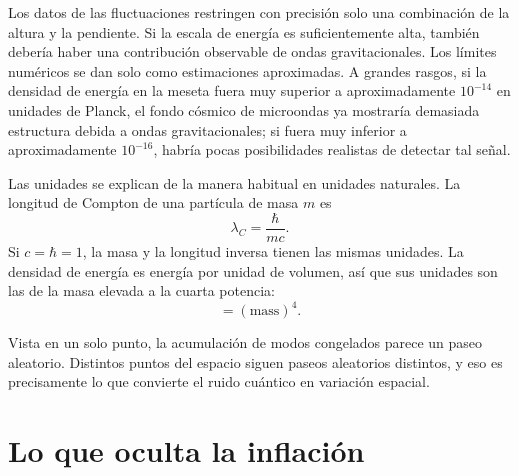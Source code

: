 Los datos de las fluctuaciones restringen con precisión solo una combinación de la altura y la pendiente. Si la escala de energía es suficientemente alta, también debería haber una contribución observable de ondas gravitacionales. Los límites numéricos se dan solo como estimaciones aproximadas. A grandes rasgos, si la densidad de energía en la meseta fuera muy superior a aproximadamente \(10^{-14}\) en unidades de Planck, el fondo cósmico de microondas ya mostraría demasiada estructura debida a ondas gravitacionales; si fuera muy inferior a aproximadamente \(10^{-16}\), habría pocas posibilidades realistas de detectar tal señal. 

Las unidades se explican de la manera habitual en unidades naturales. La longitud de Compton de una partícula de masa \(m\) es
\begin{equation}
\lambda_C=\frac{\hbar}{mc}.
\end{equation}
Si \(c=\hbar=1\), la masa y la longitud inversa tienen las mismas unidades. La densidad de energía es energía por unidad de volumen, así que sus unidades son las de la masa elevada a la cuarta potencia:
\begin{equation}
[\rho]=(\mathrm{mass})^4.
\end{equation}

Vista en un solo punto, la acumulación de modos congelados parece un paseo aleatorio. Distintos puntos del espacio siguen paseos aleatorios distintos, y eso es precisamente lo que convierte el ruido cuántico en variación espacial.

\begin{classroomqa}
\end{classroomqa}

\section{Lo que oculta la inflación}

